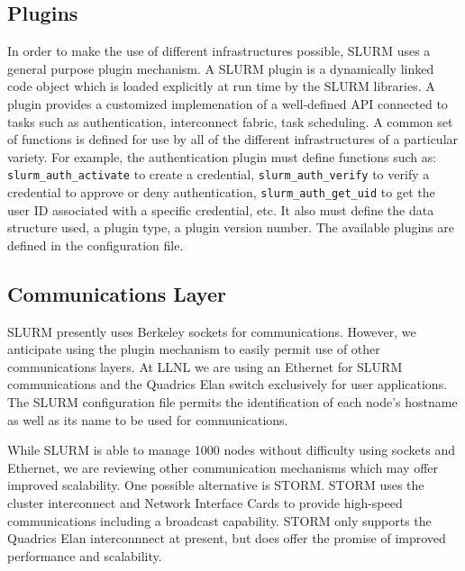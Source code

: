 \subsection{Plugins}

In order to make the use of different infrastructures possible,
SLURM uses a general purpose plugin mechanism.
A SLURM plugin is a dynamically linked code object which is
loaded explicitly at run time by the SLURM libraries.
A plugin provides a customized implemenation of a well-defined
API connected to tasks such as authentication, interconnect fabric,
task scheduling.
A common set of functions is defined for use by all of the different
infrastructures of a particular variety.
For example, the authentication plugin must define functions
such as:
{\tt slurm\_auth\_activate} to create a credential,
{\tt slurm\_auth\_verify} to verify a credential to
approve or deny authentication,
{\tt slurm\_auth\_get\_uid} to get the user ID associated with
a specific credential, etc.
It also must define the data structure used, a plugin type,
a plugin version number.
The available plugins are defined in the configuration file.

\subsection{Communications Layer}

SLURM presently uses Berkeley sockets for communications.
However, we anticipate using the plugin mechanism to easily
permit use of other communications layers.
At LLNL we are using an Ethernet for SLURM communications and
the Quadrics Elan switch exclusively for user applications.
The SLURM configuration file permits the identification of each
node's hostname as well as its name to be used for communications.

While SLURM is able to manage 1000 nodes without difficulty using
sockets and Ethernet, we are reviewing other communication
mechanisms which may offer improved scalability.
One possible alternative is STORM\cite{STORM01}.
STORM uses the cluster interconnect and Network Interface Cards to
provide high-speed communications including a broadcast capability.
STORM only supports the Quadrics Elan interconnnect at present,
but does offer the promise of improved performance and scalability.

